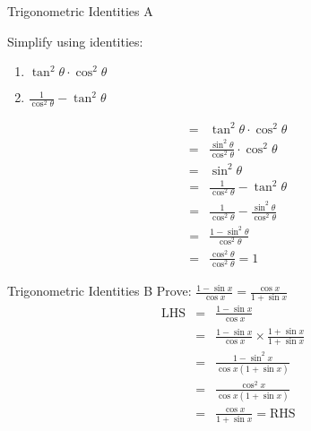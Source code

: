 \begin{wex}{Trigonometric Identities A}
{
Simplify using identities:
\begin{enumerate}
\item $\tan^2\theta \cdot \cos^2\theta$
\item $\frac{1}{\cos^2\theta} - \tan^2\theta$
\end{enumerate}
}
{
\begin{eqnarray*}
&=& \tan^2\theta \cdot \cos^2\theta \\
&=& \frac{\sin^2\theta}{\cos^2\theta}\cdot\cos^2\theta \\
&=& \sin^2\theta 
\end{eqnarray*}
\begin{eqnarray*}
&=&  \frac{1}{\cos^2\theta} - \tan^2\theta \\
&=& \frac{1}{\cos^2\theta} -\frac{\sin^2\theta}{\cos^2\theta} \\
&=& \frac{1-\sin^2\theta}{\cos^2\theta} \\
&=& \frac{\cos^2\theta}{\cos^2\theta} = 1 
\end{eqnarray*}
}
\end{wex}

\begin{wex}{Trigonometric Identities B}
{
Prove: $\frac{1-\sin x}{\cos x} = \frac{\cos x}{1+\sin x}$\nopagebreak[1]
}%
{%
\begin{eqnarray*}
\mbox{LHS} &= & \frac{1-\sin x}{\cos x} \\
 &=& \frac{1-\sin x}{\cos x} \times  \frac{1+\sin x}{1+\sin x}\\
 &=& \frac{1-\sin^2x}{\cos x(1+\sin x)}\\
 &=& \frac{\cos^2x}{\cos x(1+\sin x)} \\
 &=& \frac{\cos x}{1+\sin x} = \mbox{RHS}
\end{eqnarray*}
}%
\end{wex}

